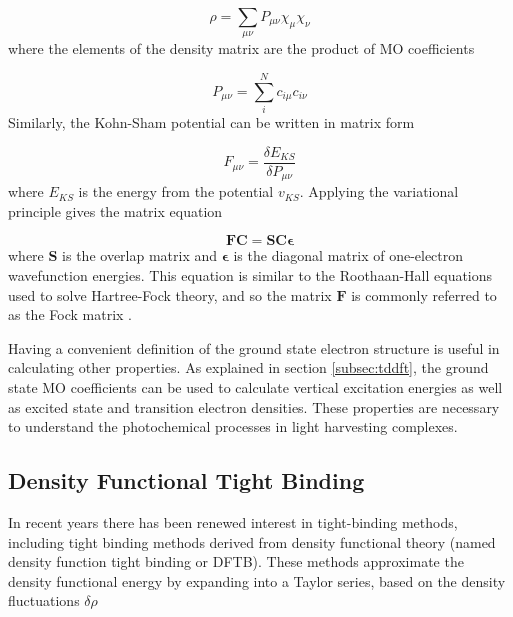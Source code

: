 \begin{equation}
    \rho = \sum_{\mu\nu} P_{\mu\nu} \chi_\mu \chi_\nu
\end{equation}
%
where the elements of the density matrix are the product of MO coefficients

\begin{equation}
    P_{\mu\nu} = \sum_i^N c_{i \mu} c_{i \nu}
\end{equation}
%
Similarly, the Kohn-Sham potential can be written in matrix form 

\begin{equation}
    F_{\mu \nu} = \frac{\delta E_{KS}}{\delta P_{\mu\nu}}
\end{equation}
%
where $E_{KS}$ is the energy from the potential $v_{KS}$. Applying the variational
principle gives the matrix equation

\begin{equation}
    \mathbf{F} \mathbf{C} = \mathbf{S} \mathbf{C} \mathbf{\epsilon}
\end{equation}
%
where $\mathbf{S}$ is the overlap matrix and $\mathbf{\epsilon}$ is the diagonal 
matrix of one-electron wavefunction energies. This equation is similar to the
Roothaan-Hall equations used to solve Hartree-Fock theory, and so the matrix $\mathbf{F}$
is commonly referred to as the Fock matrix \cite{Roothaan1951}.

Having a convenient definition of the ground state electron structure is useful
in calculating other properties. As explained in section \ref{subsec:tddft}, the
ground state MO coefficients can be used to calculate vertical excitation energies
as well as excited state and transition electron densities. These properties are
necessary to understand the photochemical processes in light harvesting complexes.

\subsection{Density Functional Tight Binding}
\label{subsec:tight_binding}
In recent years there has been renewed interest in tight-binding methods, including
tight binding methods derived from density functional theory (named density function 
tight binding or DFTB)\cite{Porezag1994}. These methods approximate the density 
functional energy by expanding into a Taylor series, based on the density fluctuations
$\delta\rho$

